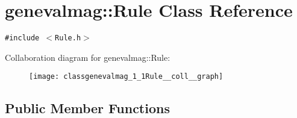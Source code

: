 \hypertarget{classgenevalmag_1_1Rule}{
\section{genevalmag::Rule Class Reference}
\label{classgenevalmag_1_1Rule}
}
{\tt \#include $<$Rule.h$>$}

Collaboration diagram for genevalmag::Rule:\nopagebreak
\begin{figure}[H]
\begin{center}
\leavevmode
\texttt{[image: classgenevalmag\_1\_1Rule\_\_coll\_\_graph]}
\end{center}
\end{figure}
\subsection*{Public Member Functions}

